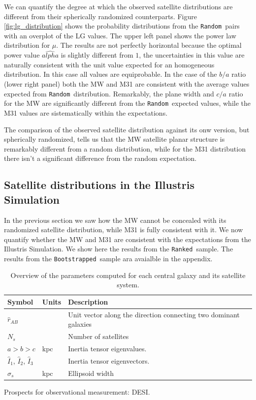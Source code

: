 \documentclass[a4paper,fleqn,usenatbib]{mnras}
\newcommand{\rank}{\texttt{Ranked}}
\newcommand{\boot}{\texttt{Bootstrapped}}
\newcommand{\rand}{\texttt{Random}}
\begin{document}
We can quantify the degree at which the observed satellite distributions are 
different from their spherically randomized counterparts.
Figure \ref{fig:lg_distribution} shows the probability distributions
from the \rand\ pairs with an overplot of the LG values.
The upper left panel shows the power law distribution for $\mu$. The
results are not perfectly horizontal because the optimal power value
$\hat{alpha}$ is slightly different from $1$, the uncertainties in
this value are naturally consistent with the unit value expected for
an homogeneous distribution. 
In this case all values are equiprobable.
In the case of the $b/a$ ratio (lower right panel) both the MW and M31
are consistent with the average values expected from \rand\ distribution.
Remarkably, the plane width and $c/a$ ratio for the MW are significantly 
different from the \rand\ expected values, while the M31 values are
sistematically within the expectations.

The comparison of the observed satellite distribution against its onw
version, but spherically randomized, tells us that the MW satellite
planar structure is remarkably different from a random distribution,
while for the M31 distribution there isn't a significant difference
from the random expectation. 

\subsection{Satellite distributions in the Illustris Simulation}

In the previous section we saw how the MW cannot be concealed with its
randomized satellite distribution, while M31 is fully consistent with
it. 
We now quantify whether the MW and M31 are consistent with the
expectations from the Illustris Simulation.
We show here the results from the \rank\ sample. 
The results from the \boot\ sample ara avaialble in the appendix.









\begin{table}
  \centering
\begin{tabular}{lll}
\hline\hline
Symbol & Units & Description\\\hline
$\hat{r}_{AB}$& & Unit vector along the direction connecting two
dominant galaxies\\
$N_s$ & & Number of satellites\\
$a > b> c$ & kpc & Inertia tensor eigenvalues. \\
$\hat{I}_1$, $\hat{I}_2$, $\hat{I}_3$ & & Inertia tensor eigenvectors. \\
$\sigma_s$ & kpc & Ellipsoid width\\
\hline\hline
\end{tabular}
  \caption{Overview of the parameters computed for each central galaxy
    and its satellite system.
  \label{tab:models}}
\end{table}

Prospects for observational measurement: DESI.






\end{document}
